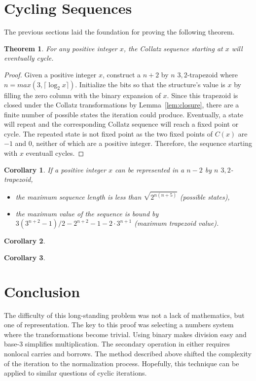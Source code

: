 \documentclass{article}
\newtheorem{theorem}{Theorem}
\newtheorem{corollary}{Corollary}
\begin{document}
\section{Cycling Sequences}

The previous sections laid the foundation for proving the following theorem.

\begin{theorem}
  {For any positive integer $x$, the Collatz sequence starting at $x$ will eventually
  cycle.}
\end{theorem}

\begin{proof}
Given a positive integer $x$, construct a $n+2$ by $n$ ${3,2}$-trapezoid where
$n=max(3, \lceil \log_2x \rceil)$.  Initialize the bits so that the
structure's value is $x$ by filling the zero column with the binary expansion
of $x$. Since this trapezoid is closed under the Collatz transformations by
Lemma~\ref{lem:closure}, there are a finite number of possible states the
iteration could produce. Eventually, a state will repeat and the corresponding
Collatz sequence will reach a fixed point or cycle. The repeated state is not
fixed point as the two fixed points of $C(x)$ are $-1$ and $0$, neither of
which are a positive integer. Therefore, the sequence starting with $x$ eventuall cycles.
\end{proof}

\begin{corollary}
  If a positive integer $x$ can be represented in a $n-2$ by $n$ ${3,2}$-trapezoid,
  \begin{itemize}
  \item the maximum sequence length is less than $\sqrt{2^{n(n+5)}}$ (possible states),
  \item the maximum value of the sequence is bound by $3(3^{n+2}-1)/2 - 2^{n+2}-1-2\cdot3^{n+1}$
    (maximum trapezoid value).
  \end{itemize}
\end{corollary}

\begin{corollary}
\end{corollary}

\begin{corollary}
\end{corollary}

\section{Conclusion}

The difficulty of this long-standing problem was not a lack of mathematics, but
one of representation. The key to this proof was selecting a numbers system where
the transformations become trivial. Using binary makes division easy and base-3 simplifies
multiplication. The secondary operation in either requires nonlocal carries and borrows.
The method described above shifted the complexity of the iteration to the normalization
process. Hopefully, this technique can be applied to similar questions of cyclic iterations.



\end{document}
